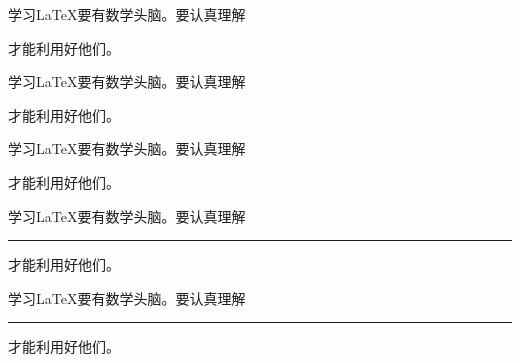 \documentclass{ctexart}
\begin{document}
学习\LaTeX 要有数学头脑。要认真理解
\begin{minipage}{1.76cm}
\end{minipage}
才能利用好他们。

\rule[-1cm]{0mm}{0mm}

学习\LaTeX 要有数学头脑。要认真理解
\begin{minipage}[t]{1.76cm}
\end{minipage}
才能利用好他们。

\rule[-1cm]{0mm}{0mm}

学习\LaTeX 要有数学头脑。要认真理解
\begin{minipage}[b]{1.76cm}
\end{minipage}
才能利用好他们。

\rule[-1cm]{0mm}{0mm}

学习\LaTeX 要有数学头脑。要认真理解
\begin{minipage}[b]{1.76cm}
\hrule height 0pt
\end{minipage}
才能利用好他们。

\rule[-1cm]{0mm}{0mm}

学习\LaTeX 要有数学头脑。要认真理解
\begin{minipage}[b]{1.76cm}
\hrule height 0pt
\end{minipage}
才能利用好他们。
\end{document}
